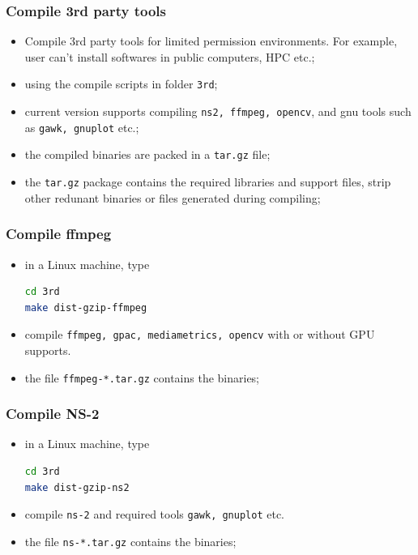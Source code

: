 \documentclass{beamer}
\theoremstyle{definition}
\theoremstyle{remark}
\begin{document}
\begin{frame}[fragile]
  \frametitle<presentation>{Compile 3rd party tools}

    \begin{itemize}
      \item Compile 3rd party tools for limited permission environments. For example, user can't install softwares in public computers, HPC etc.;
      \item using the compile scripts in folder \texttt{3rd};
      \item current version supports compiling \texttt{ns2, ffmpeg, opencv}, and gnu tools such as \texttt{gawk, gnuplot} etc.;
      \item the compiled binaries are packed in a \texttt{tar.gz} file;
      \item the \texttt{tar.gz} package contains the required libraries and support files, strip other redunant binaries or files generated during compiling;
    \end{itemize}

\end{frame}




\begin{frame}[fragile]
  \frametitle<presentation>{Compile ffmpeg}

    \begin{itemize}
      \item in a Linux machine, type
\begin{lstlisting}[language=bash]
cd 3rd
make dist-gzip-ffmpeg
\end{lstlisting}
      \item compile \texttt{ffmpeg, gpac, mediametrics, opencv} with or without GPU supports.
      \item the file \texttt{ffmpeg-*.tar.gz} contains the binaries;
    \end{itemize}

\end{frame}



\begin{frame}[fragile]
  \frametitle<presentation>{Compile NS-2}

    \begin{itemize}
      \item in a Linux machine, type
\begin{lstlisting}[language=bash]
cd 3rd
make dist-gzip-ns2
\end{lstlisting}
      \item compile \texttt{ns-2} and required tools \texttt{gawk, gnuplot} etc.
      \item the file \texttt{ns-*.tar.gz} contains the binaries;
    \end{itemize}

\end{frame}
\end{document}
